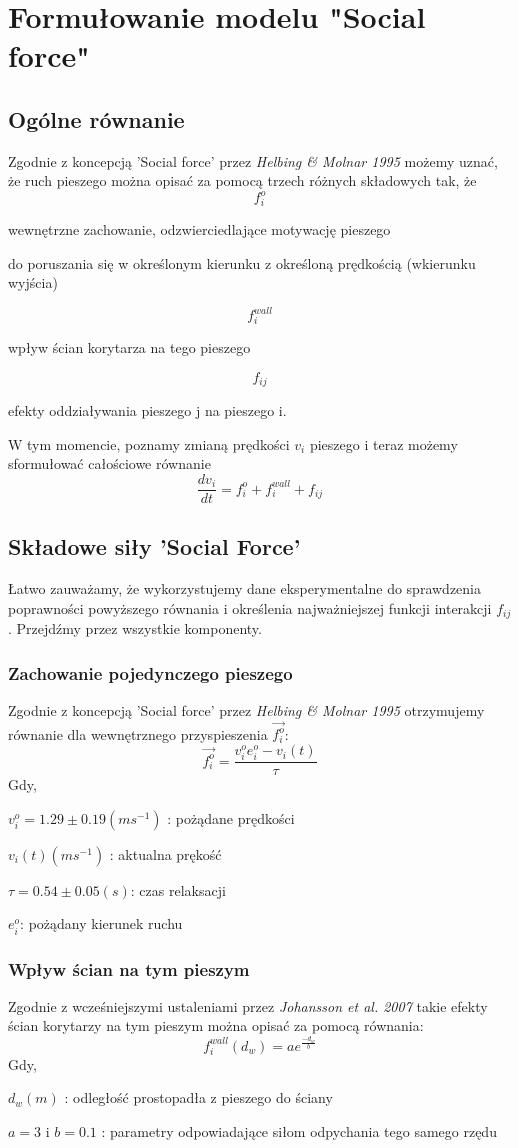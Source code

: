 \chapter{Formułowanie modelu "Social force"}
\section{Ogólne równanie}
\hspace{4ex}Zgodnie z koncepcją 'Social force' przez {\it Helbing \& Molnar 1995} możemy uznać, że ruch pieszego można opisać za pomocą trzech różnych składowych tak, że 
$$f_{i}^{o}$$  \centerline{wewnętrzne zachowanie, odzwierciedlające motywację pieszego} \centerline{do poruszania się w określonym kierunku z określoną prędkością (wkierunku wyjścia)} 
$$f_{i}^{wall}$$ \centerline{wpływ ścian korytarza na tego pieszego}
$$f_{ij}$$ \centerline{efekty oddziaływania pieszego j na pieszego i.}
\par \medskip W tym momencie, poznamy zmianą prędkości $v_{i}$ pieszego i teraz możemy sformułować całościowe równanie
$$
\frac{dv_{i}}{dt} = f_{i}^{o} + f_{i}^{wall} + f_{ij}
$$
\section{Składowe siły 'Social Force'}
\hspace{4ex}Łatwo zauważamy, że wykorzystujemy dane eksperymentalne do sprawdzenia poprawności powyższego równania i określenia najważniejszej funkcji interakcji $f_{ij}$. Przejdźmy przez wszystkie komponenty.
\subsection{Zachowanie pojedynczego pieszego}
\hspace{4ex}Zgodnie z koncepcją 'Social force' przez {\it Helbing \& Molnar 1995} otrzymujemy równanie dla wewnętrznego przyspieszenia $\vec{f_i^o}$:
$$\vec{f_{i}^{o}} = \frac{v_i^oe_i^o-v_{i}(t)}{\tau}$$
Gdy,\\ \centerline{$v_i^o = 1.29 \pm 0.19(ms^{-1})$ : pożądane prędkości}
\centerline{$v_i(t) (ms^{-1})$ : aktualna prękość}
\centerline{$\tau = 0.54 \pm 0.05(s)$: czas relaksacji}
\centerline{$e_i^o$: pożądany kierunek ruchu}
\subsection{Wpływ ścian na tym pieszym}
\hspace{4ex}Zgodnie z wcześniejszymi ustaleniami przez {\it Johansson et al. 2007} takie efekty ścian korytarzy na tym pieszym można opisać za pomocą równania:
$$
f_i^{wall}(d_w) = ae^{\frac{-d_w}{b}}
$$
Gdy, \\
\centerline{$d_w (m)$ : odległość prostopadła z pieszego do ściany}
\centerline{$a = 3$ i $b = 0.1$ : parametry odpowiadające siłom odpychania tego samego rzędu}
